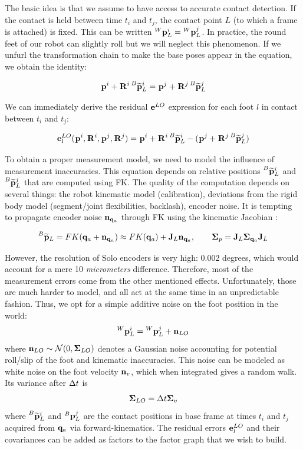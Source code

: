 The basic idea is that we assume to have access to accurate contact detection. If the contact is held between time $t_i$ and $t_j$,
the contact point $L$ (to which a frame is attached) is fixed. This can be written $\prescript{W}{}{{\bf p}}_{L}^i = \prescript{W}{}{{\bf p}}_{L}^j$. 
In practice, the round feet of our robot can slightly roll but we will neglect this phenomenon. 
If we unfurl the transformation chain to make the base poses appear in the equation, we obtain the identity:

\begin{equation}
    \prescript{}{}{{\bf p}}_{}^i + \prescript{}{}{{\bf R}}_{}^i \prescript{B}{}{\widetilde{{\bf p}}}_{L}^i = \prescript{}{}{{\bf p}}_{}^j + \prescript{}{}{{\bf R}}_{}^j \prescript{B}{}{\widetilde{{\bf p}}}_{L}^j
\end{equation}

We can immediately derive the residual ${\bf e}^{LO}$ expression for each foot $l$ in contact between $t_i$ and $t_j$:

\begin{equation}
    {\bf e}^{LO}_l(\prescript{}{}{{\bf p}}_{}^i, \prescript{}{}{{\bf R}}_{}^i, \prescript{}{}{{\bf p}}_{}^j, \prescript{}{}{{\bf R}}_{}^j) = \prescript{}{}{{\bf p}}_{}^i + \prescript{}{}{{\bf R}}_{}^i \prescript{B}{}{\widetilde{{\bf p}}}_{L}^i - (\prescript{}{}{{\bf p}}_{}^j + \prescript{}{}{{\bf R}}_{}^j \prescript{B}{}{\widetilde{{\bf p}}}_{L}^j)
\end{equation}

To obtain a proper measurement model, we need to model the influence of measurement inaccuracies.
This equation depends on relative positions $\prescript{B}{}{\widetilde{{\bf p}}}_{L}^i$ and $\prescript{B}{}{\widetilde{{\bf p}}}_{L}^j$ that are computed using FK. The quality of the computation depends on several things:
the robot kinematic model (calibration), deviations from the rigid body model (\eg segment/joint flexibilities, backlash), encoder noise.
It is tempting to propagate encoder noise ${\bf n}_{{\bf q}_a}$ through FK using the kinematic Jacobian \cite{bloesch2013state, hartley2018legged}:

\begin{equation}
    \prescript{B}{}{\widetilde{{\bf p}}}_{L} = FK({\bf q}_a + {\bf n}_{{\bf q}_a}) \approx FK({\bf q}_a) + {\bf J}_L{\bf n}_{{\bf q}_a}, \quad \quad {\bm \Sigma}_{p} = {\bf J}_L {\bm \Sigma}_{{\bf q}_a} {\bf J}_L
\end{equation}

However, the resolution of Solo encoders is very high: 0.002 degrees, which would account for a mere 10 \textit{micrometers} difference.
Therefore, most of the measurement errors come from the other mentioned effects. Unfortunately, those are much harder to model, and all act at the same time
in an unpredictable fashion. Thus, we opt for a simple additive noise on the foot position in the world:
%
\begin{equation}
    \prescript{W}{}{{\bf p}}_{L}^i = \prescript{W}{}{{\bf p}}_{L}^j + {\bf n}_{LO}
\end{equation}
%
where ${\bf n}_{LO} \sim \mathcal{N}({0},{{\bm \Sigma}_{LO}})$ denotes a Gaussian noise accounting for potential roll/slip of the foot and kinematic inaccuracies.
This noise can be modeled as white noise on the foot velocity ${\bf n}_v$, which when integrated gives a random walk.  
Its variance after $\Delta t$ is 
%
\begin{equation}
    {\bm \Sigma}_{LO} = \Delta t {\bm \Sigma}_v
\end{equation}
%
where $\prescript{B}{}{\widetilde{{\bf p}}}_{L}^i$ and $\prescript{B}{}{{\bf p}}_{L}^j$ are the contact positions in base frame at times $t_i$ and $t_j$ acquired from ${\bf q}_a$ via forward-kinematics. 
The residual errors ${\bf e}^{LO}_l$ and their covariances can be added as factors to the factor graph that we wish to build.

